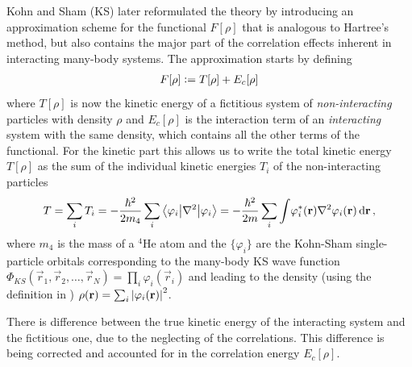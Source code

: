 		Kohn and Sham (KS) later reformulated\citep{Kohn1965} the theory by introducing an approximation scheme for the functional $F[\rho]$ that is analogous to Hartree's method, but also contains the major part of the correlation effects inherent in interacting many-body systems. The approximation starts by defining
		\begin{align}
			F[\rho] \vcentcolon= T[\rho] + E_{c}[\rho]
		\end{align}
		where $T[\rho]$ is now the kinetic energy of a fictitious system of \emph{non-interacting} particles with density $\rho$ and $E_c[\rho]$ is the interaction term of an \emph{interacting} system with the same density, which contains all the other terms of the functional. For the kinetic part this allows us to write the total kinetic energy $T[\rho]$ as the sum of the individual kinetic energies $T_i$ of the non-interacting particles
		\begin{align}
			T = \sum_i T_i = -\frac{\hbar^2}{2m_4} \sum_i \ev**{\laplacian}{\varphi_i} = -\frac{\hbar^2}{2m} \sum_i \int\! \varphi_i^*({\mathbf r})\laplacian \varphi_i({\mathbf r})\diff{r}\,, \label{eq:kin-energy}
		\end{align}
		where $m_4$ is the mass of a $^4$He atom and the $\{\varphi_i\}$ are the Kohn-Sham single-particle orbitals corresponding to the many-body KS wave function $\Phi_{KS}(\vec{r}_1,\vec{r}_2,\ldots,\vec{r}_N)=\prod_i\varphi_i(\vec{r}_i)$ and leading to the density (using the definition in ) $\rho(\vec{r})=\sum_i\absolutevalue{\varphi_i(\vec{r})}^2$.
	
		There is difference between the true kinetic energy of the interacting system and the fictitious one, due to the neglecting of the correlations. This difference is being corrected and accounted for in the correlation energy $E_c[\rho]$.
		
